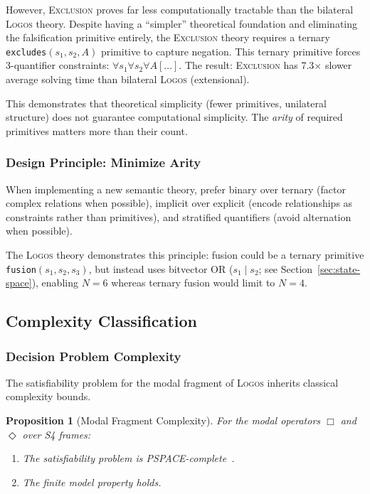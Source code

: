 \documentclass[pdflatex,sn-mathphys-num]{sn-jnl}
\newcommand{\nec}{\Box}                     %
\newcommand{\poss}{\Diamond}                %
\newcommand{\theorylogos}{\textsc{Logos}}
\newcommand{\theoryexclusion}{\textsc{Exclusion}}
\newcommand{\zfusion}{\texttt{fusion}}
\newcommand{\zexcludes}{\texttt{excludes}}
\theoremstyle{thmstyleone}
\newtheorem{proposition}[theorem]{Proposition}
\theoremstyle{thmstyletwo}
\theoremstyle{thmstylethree}
\begin{document}
However, \theoryexclusion{} proves far less computationally tractable than the bilateral \theorylogos{} theory.
Despite having a ``simpler'' theoretical foundation and eliminating the falsification primitive entirely, the \theoryexclusion{} theory requires a ternary \zexcludes{}$(s_1, s_2, A)$ primitive to capture negation.
This ternary primitive forces 3-quantifier constraints: $\forall s_1 \forall s_2 \forall A[\ldots]$.
The result: \theoryexclusion{} has 7.3$\times$ slower average solving time than bilateral \theorylogos{} (extensional).

This demonstrates that theoretical simplicity (fewer primitives, unilateral structure) does not guarantee computational simplicity.
The \emph{arity} of required primitives matters more than their count.

\subsubsection{Design Principle: Minimize Arity}

When implementing a new semantic theory, prefer binary over ternary (factor complex relations when possible), implicit over explicit (encode relationships as constraints rather than primitives), and stratified quantifiers (avoid alternation when possible).

The \theorylogos{} theory demonstrates this principle: fusion could be a ternary primitive \zfusion{}$(s_1, s_2, s_3)$, but instead uses bitvector OR ($s_1 \mathbin{|} s_2$; see Section~\ref{sec:state-space}), enabling $N=6$ whereas ternary fusion would limit to $N=4$.

\subsection{Complexity Classification}\label{sec:complexity-classification}

\subsubsection{Decision Problem Complexity}

The satisfiability problem for the modal fragment of \theorylogos{} inherits classical complexity bounds.

\begin{proposition}[Modal Fragment Complexity]
For the modal operators $\nec$ and $\poss$ over S4 frames:
\begin{enumerate}
    \item The satisfiability problem is PSPACE-complete~\cite{ladner1977}.
    \item The finite model property holds.
\end{enumerate}
\end{proposition}
\end{document}
